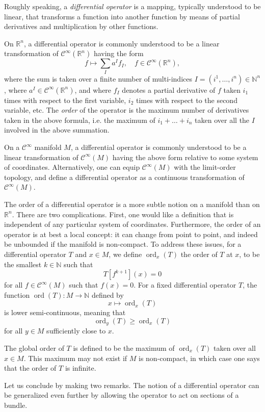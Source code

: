 \documentclass[12pt]{article}
\newcommand{\reals}{\mathbb{R}}
\newcommand{\natnums}{\mathbb{N}}
\newcommand{\cfty}{\mathcal{C}^\infty}
\newcommand{\ord}{\mathop{\mathrm{ord}}\nolimits}
\begin{document}
Roughly speaking, a {\em differential operator} is a mapping,
typically understood to be linear, that transforms a function into
another function by means of partial derivatives and multiplication by
other functions.  

On $\reals^n$, a differential operator is commonly understood to be a
linear transformation of $\cfty(\reals^n)$ having the form
$$  f \mapsto \sum_{I} a^I f_I,\quad f\in
\cfty(\reals^n),  
$$
where the sum is taken over a finite number of multi-indices
$I=(i^1,\ldots,i^n)\in \natnums^n$, where $a^I\in
\cfty(\reals^n)$, and where $f_I$ denotes a partial
derivative of $f$ taken $i_1$ times with respect to the first
variable, $i_2$ times with respect to the second variable, etc.
The {\em order} of the operator is the maximum number of derivatives
taken in the above formula, i.e. the maximum of $i_1+\ldots+i_n$
taken over all the $I$ involved in the above summation.

On a $\cfty$ manifold $M$, a differential operator is commonly
understood to be a linear transformation of $\cfty(M)$ having the
above form relative to some system of coordinates.  Alternatively, one
can equip $\cfty(M)$ with the limit-order topology, and define a
differential operator as a continuous transformation of $\cfty(M)$.

The order of a differential operator is a more subtle notion on a
manifold than on $\reals^n$.  There are two complications. First, one
would like a definition that is independent of any particular system
of coordinates.  Furthermore, the order of an operator is at best a local
concept: it can change from
point to point, and indeed be unbounded if the manifold is
non-compact.  To address these issues, for a differential operator $T$
and $x\in M$, 
we define $\ord_x(T)$ the order of $T$ at $x$, to be the smallest
$k\in\natnums$ such that
$$T[f^{k+1}](x) = 0$$
for all $f\in\cfty(M)$ such that $f(x)=0$.  For
a fixed differential operator $T$, the function $\ord(T):M\rightarrow
\natnums$ defined by
$$x\mapsto \ord_x(T)$$
is lower semi-continuous, meaning that
$$\ord_y(T)\geq \ord_x(T)$$
for all $y\in M$ sufficiently close to $x$.

The global order of $T$ is defined to be the maximum of $\ord_x(T)$
taken over all $x\in M$.  This maximum may not exist if $M$ is
non-compact, in which case one says that the order of $T$ is infinite.

Let us conclude by making two remarks. The notion of a differential
operator can be generalized even further by allowing the operator to
act on sections of a bundle.
\end{document}
